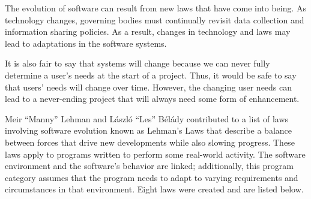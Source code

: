 The evolution of software can result from new laws that have come into being. As technology changes, governing bodies must continually revisit data collection and information sharing policies. As a result, changes in technology and laws may lead to adaptations in the software systems.

It is also fair to say that systems will change because we can never fully determine a user's needs at the start of a project. Thus, it would be safe to say that users' needs will change over time. However, the changing user needs can lead to a never-ending project that will always need some form of enhancement.

Meir ``Manny'' Lehman and László ``Les'' Bélády contributed to a list of laws involving software evolution known as Lehman's Laws that describe a balance between forces that drive new developments while also slowing progress. These laws apply to programs written to perform some real-world activity. The software environment and the software's behavior are linked; additionally, this program category assumes that the program needs to adapt to varying requirements and circumstances in that environment. Eight laws were created and are listed below. \cite{wiki:lehmans-laws}


